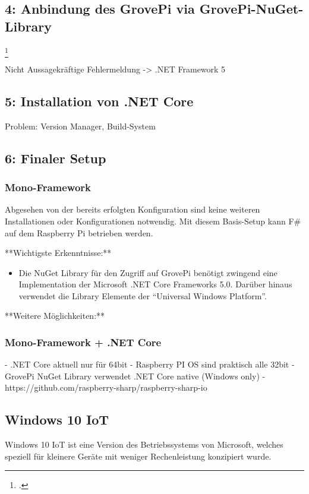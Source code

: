 \subsection{4: Anbindung des GrovePi via GrovePi-NuGet-Library}
\footcite{NuGet_GrovePi_2016-04-24}

Nicht Aussagekräftige Fehlermeldung -> .NET Framework 5

\subsection{5: Installation von .NET Core}
Problem: Version Manager, Build-System

\subsection{6: Finaler Setup}

\subsubsection{Mono-Framework}
Abgesehen von der bereits erfolgten Konfiguration sind keine weiteren Installationen oder Konfigurationen notwendig. Mit diesem Basis-Setup kann F\# auf dem Raspberry Pi betrieben werden.

**Wichtigste Erkenntnisse:**
\begin{itemize}
\item Die NuGet Library für den Zugriff auf GrovePi benötigt zwingend eine Implementation der Microsoft .NET Core Frameworks 5.0. Darüber hinaus verwendet die Library Elemente der "`Universal Windows Platform"'.
\end{itemize}

**Weitere Möglichkeiten:**

\subsubsection{Mono-Framework + .NET Core}
  - .NET Core aktuell nur für 64bit
  - Raspberry PI OS sind praktisch alle 32bit
  - GrovePi NuGet Library verwendet .NET Core native (Windows only)
  - https://github.com/raspberry-sharp/raspberry-sharp-io

\subsection{Windows 10 IoT}
Windows 10 IoT ist eine Version des Betriebssystems von Microsoft, welches speziell für kleinere Geräte mit weniger Rechenleistung konzipiert wurde.

